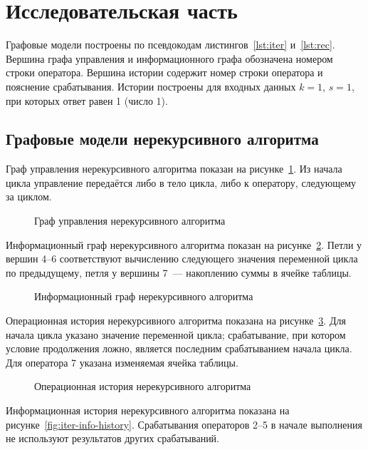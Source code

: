 \clearpage
\section{Исследовательская часть}

Графовые модели построены по псевдокодам листингов~\ref{lst:iter}
и~\ref{lst:rec}. Вершина графа управления и информационного графа обозначена
номером строки оператора. Вершина истории содержит номер строки оператора
и пояснение срабатывания. Истории построены для входных данных $k=1$, $s=1$,
при которых ответ равен 1 (число 1).

\subsection{Графовые модели нерекурсивного алгоритма}

Граф управления нерекурсивного алгоритма показан на рисунке~\ref{fig:iter-control}.
Из начала цикла управление передаётся либо в тело цикла, либо
к оператору, следующему за циклом.

\begin{figure}[H]
    \centering
    \caption{Граф управления нерекурсивного алгоритма}
    \label{fig:iter-control}
\end{figure}

Информационный граф нерекурсивного алгоритма показан на
рисунке~\ref{fig:iter-info}. Петли у вершин 4--6 соответствуют вычислению
следующего значения переменной цикла по предыдущему, петля у вершины 7~---
накоплению суммы в ячейке таблицы.

\begin{figure}[H]
    \centering
    \caption{Информационный граф нерекурсивного алгоритма}
    \label{fig:iter-info}
\end{figure}

Операционная история нерекурсивного алгоритма показана на
рисунке~\ref{fig:iter-op-history}. Для начала цикла указано значение
переменной цикла; срабатывание, при котором условие продолжения ложно, является
последним срабатыванием начала цикла. Для оператора 7 указана изменяемая
ячейка таблицы.

\begin{figure}[H]
    \centering
    \caption{Операционная история нерекурсивного алгоритма}
    \label{fig:iter-op-history}
\end{figure}

Информационная история нерекурсивного алгоритма показана на
рисунке~\ref{fig:iter-info-history}. Срабатывания операторов 2--5 в начале
выполнения не используют результатов других срабатываний.

